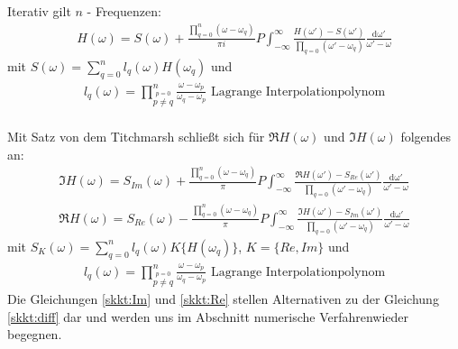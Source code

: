 Iterativ gilt $n$ - Frequenzen:
\begin{align}
H(\omega) = S(\omega) + \frac{\prod_{q=0}^{n} (\omega - \omega_q)}{\pi i} P \int_{-\infty}^{\infty} \frac{H(\omega') - S(\omega')}{\prod_{q = 0} (\omega' - \omega_q)} \frac{\mathrm{d\omega'}}{\omega' -\omega} 
\end{align}
mit $S(\omega) = \sum_{q=0}^{n} l_q(\omega) H(\omega_q)$ und 
\begin{align}
	l_q(\omega) = \prod_{\stackrel{p=0 }{p \neq q}}^n \frac{\omega - \omega_p}{\omega_q - \omega_p} \text{ Lagrange Interpolationpolynom}
\end{align}\cite{Triverio2006a}\\
Mit Satz von dem Titchmarsh schließt sich für $\Re{H(\omega)}$ und $\Im{H(\omega)}$ folgendes an:
\begin{align}
\Im{H(\omega)} = S_{Im}(\omega) + \frac{\prod_{q=0}^{n} (\omega - \omega_q)}{\pi} P \int_{-\infty}^{\infty} \frac{\Re{H(\omega')} - S_{Re}(\omega')}{\prod_{q = 0} (\omega' - \omega_q)} \frac{\mathrm{d\omega'}}{\omega' -\omega}\label{skkt:Im} \\
\Re{H(\omega)} = S_{Re}(\omega) - \frac{\prod_{q=0}^{n} (\omega - \omega_q)}{\pi} P \int_{-\infty}^{\infty} \frac{\Im{H(\omega')} - S_{Im}(\omega')}{\prod_{q = 0} (\omega' - \omega_q)} \frac{\mathrm{d\omega'}}{\omega' -\omega}\label{skkt:Re}
\end{align}
mit $S_K(\omega) = \sum_{q=0}^{n} l_q(\omega) K\{H(\omega_q)\}$, $K = \{Re, Im\}$ und 
\begin{align}
	l_q(\omega) = \prod_{\stackrel{p=0 }{p \neq q}}^n \frac{\omega - \omega_p}{\omega_q - \omega_p} \text{ Lagrange Interpolationpolynom}
\end{align}
Die Gleichungen \ref{skkt:Im} und \ref{skkt:Re} stellen Alternativen zu der Gleichung \ref{skkt:diff} dar und werden uns im Abschnitt \grqq numerische Verfahren\grqq wieder begegnen.
